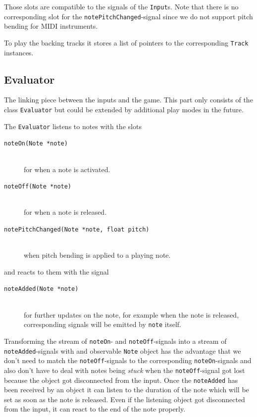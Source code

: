 Those slots are compatible to the signals of the {\tt Input}s. Note that there is no corresponding slot for the {\tt notePitchChanged}-signal since we do not support pitch bending for MIDI instruments.

To play the backing tracks it stores a list of pointers to the corresponding {\tt Track} instances.

\subsection{Evaluator}
The linking piece between the inputs and the game. This part only consists of the class {\tt Evaluator} but could be extended by additional play modes in the future. 

The {\tt Evaluator} listens to notes with the slots 
\begin{description}
	\item[{\tt noteOn(Note *note)}] \hfil \\ for when a note is activated.
	\item[{\tt noteOff(Note *note)}] \hfil \\ for when a note is released.
	\item[{\tt notePitchChanged(Note *note, float pitch)}] \hfil \\ when pitch bending is applied to a playing note.
\end{description}
and reacts to them with the signal
\begin{description}
	\item[{\tt noteAdded(Note *note)}]\hfil \\ for further updates on the note, for example when the note is released, corresponding signals will be emitted by {\tt note} itself.
\end{description}

Transforming the stream of {\tt noteOn}- and {\tt noteOff}-signals into a stream of {\tt noteAdded}-signals with and observable {\tt Note} object has the advantage that we don't need to match the {\tt noteOff}-signals to the corresponding {\tt noteOn}-signals and also don't have to deal with notes being \emph{stuck} when the {\tt noteOff}-signal got lost because the object got disconnected from the input. Once the {\tt noteAdded} has been received by an object it can listen to the duration of the note which will be set as soon as the note is released. Even if the listening object got disconnected from the input, it can react to the end of the note properly.

